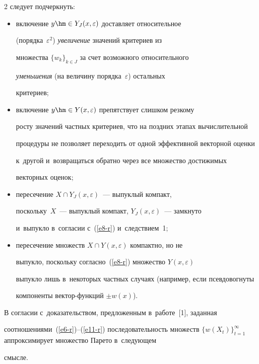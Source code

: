 \begin{multicols}{2}
следует подчеркнуть:


\begin{itemize}


\item включение $y\hm\in Y_J(x,\varepsilon)$ доставляет относительное 


(порядка~$\varepsilon^2$) \textit{увеличение} значений критериев из 


множества $\{ w_k\}_{k\in J}$ за счет возможного относительного 


\textit{уменьшения} (на величину порядка~$\varepsilon$) остальных 


критериев;


\item включение $y\hm\in Y(x,\varepsilon)$ препятствует слишком резкому 


росту значений частных критериев, что на поздних этапах вычислительной 


процедуры не позволяет переходить от одной эффективной векторной оценки 


к~другой и~возвращаться обратно через все множество достижимых 


векторных оценок;


\item пересечение $X\cap Y_J (x,\varepsilon)$~--- выпуклый компакт, 


поскольку~$X$~--- выпуклый компакт, $ Y_J(x,\varepsilon)$~--- замкнуто 


и~выпукло в~согласии с~(\ref{e8-r}) и~следствием~1;


\item пересечение множеств $X\cap Y(x,\varepsilon)$ компактно, но не 


выпукло, поскольку согласно~(\ref{e8-r}) множество $ Y(x,\varepsilon)$ 


выпукло лишь в~некоторых частных случаях (например, если псевдовогнуты 


компоненты век\-тор-функ\-ций $\pm w(x)$).


\end{itemize}


  


  В согласии с~доказательством, предложенным в~работе~[1], заданная 


соотношениями~(\ref{e6-r})--(\ref{e11-r}) последовательность множеств $\{ 


w(X_t)\}^\infty_{t=1}$ аппроксимирует множество Парето в~следующем 


смысле.



\end{multicols}
